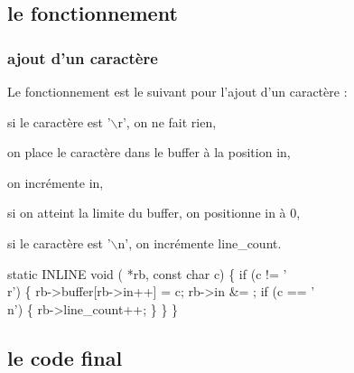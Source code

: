 \documentclass{scrartcl}%
\begin{document}
\subsection{le fonctionnement}
\subsubsection{ajout d'un caractère}
Le fonctionnement est le suivant pour l'ajout d'un caractère :

\begin{packed_itemize}
  \item si le caractère est '$\backslash$r', on ne fait rien,
  \item on place le caractère dans le buffer à la position {\Tt{}in\nwendquote},
  \item on incrémente {\Tt{}in\nwendquote},
  \item si on atteint la limite du buffer, on positionne {\Tt{}in\nwendquote} à 0,
  \item si le caractère est '$\backslash$n', on incrémente {\Tt{}line{\_}count\nwendquote}.
\end{packed_itemize}

\nwenddocs{}\endmoddef\nwstartdeflinemarkup{}\nwenddeflinemarkup
static INLINE void ( *rb, const char c) \{
    if (c != '\\r') \{
        rb->buffer[rb->in++] = c;
        rb->in &= ;
        if (c == '\\n') \{
            rb->line_count++;
        \}
    \}
\}


\nwendcode{}\nwdocspar
\subsection{le code final}
\end{document}
